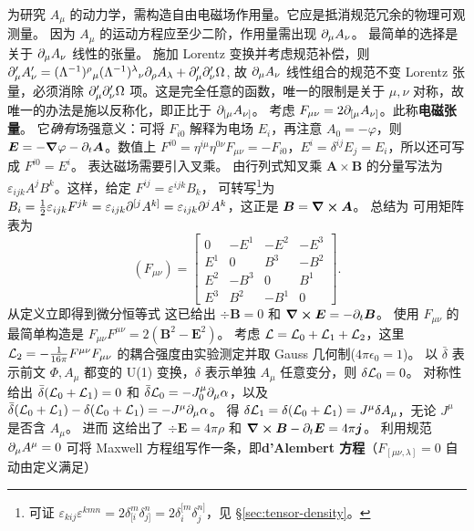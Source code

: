 为研究 $A_\mu$ 的动力学，需构造自由电磁场作用量。它应是抵消规范冗余的物理可观测量。
因为 $A_\mu$ 的运动方程应至少二阶，作用量需出现 $\partial_\mu A_\nu$。
最简单的选择是关于 $\partial_\mu A_\nu$ 线性的张量。
施加 Lorentz 变换并考虑规范补偿，则 $\partial'_\mu A'_\nu = (\Lambda^{-1})^{\rho}{}_{\mu} (\Lambda^{-1})^{\lambda}{}_{\nu} \partial_{\rho}A_{\lambda} + \partial'_{\mu}\partial'_{\nu}\Omega$,
故 $\partial_\mu A_\nu$ 线性组合的规范不变 Lorentz 张量，必须消除 $\partial'_{\mu}\partial'_{\nu}\Omega$ 项。这是完全任意的函数，唯一的限制是关于 $\mu,\nu$ 对称，故唯一的办法是施以反称化，即正比于 $\partial_{[\mu} A_{\nu]}$。
考虑 $F_{\mu\nu}=2\partial_{[\mu} A_{\nu]}$。此称\textbf{电磁张量}。
它\textit{确有}场强意义：可将 $F_{i0}$ 解释为电场 $E_i$，再注意 $A_0=-\varphi$，则 $\bm E=-\grad\varphi-\partial_t{\bm A}$。数值上 $F^{i0}=\eta^{i\mu}\eta^{0\nu}F_{\mu\nu}=-F_{i0}$，$E^i=\delta^{ij}E_j=E_i$，所以还可写成 $F^{i0}=E^i$。
表达磁场需要引入叉乘。
由行列式知叉乘 $\bm A\times \bm B$ 的分量写法为 $\varepsilon_{ijk} A^j B^k$。这样，给定 $F^{ij}=\varepsilon^{ijk}B_k$，
可转写\footnote{可证 $\varepsilon_{kij} \varepsilon^{kmn} =2\delta_{[i}^{m}\delta_{j]}^{n}=2\delta_{i}^{[m}\delta_{j}^{n]}$，见 \S\ref{sec:tensor-density}。}为 $B_i=\frac 12 \varepsilon_{ijk}F^{jk}=\varepsilon_{ijk}\partial^{[j}A^{k]}=\varepsilon_{ijk}\partial^j A^k$，这正是 $\bm B=\curl\bm A$。
总结为
可用矩阵表为
\[\left(F_{\mu\nu}\right)=\left[\begin{array}{cccc}0& -E^{1} & -E^{2} & -E^{3}\\E^{1} & 0 & B^{3} & -B^{2} \\E^{2} & -B^{3} & 0 & B^{1} \\E^{3} & B^{2} & -B^{1} & 0 \end{array}\right].\]
从定义立即得到微分恒等式
这已给出 $\div\bm B=0$ 和 $\curl\bm E=-\partial_t \bm B$。%
使用 $F_{\mu\nu}$ 的最简单构造是 $F_{\mu\nu} F^{\mu\nu}=2(\bm B^2-\bm E^2)$。
考虑 $\mathcal{L}= \mathcal{L}_0 + \mathcal{L}_1 + \mathcal{L}_2$，这里 $\mathcal{L}_2 = -\frac{1}{16\pi}F^{\mu\nu} F_{\mu\nu}$ 的耦合强度由实验测定并取 Gauss 几何制($4\pi\epsilon_0 = 1$)。
以 $\bar\delta$ 表示前文 $\Phi,A_\mu$ 都变的 U(1) 变换，$\delta$ 表示单独 $A_\mu$ 任意变分，则 $\delta\mathcal{L}_0=0$。
对称性给出 $\bar\delta(\mathcal{L}_0+\mathcal{L}_1) = 0$ 和 $\bar\delta\mathcal{L}_0 = -J_0^\mu\partial_\mu\alpha$，以及 $\bar\delta(\mathcal{L}_0+\mathcal{L}_1) - \delta(\mathcal{L}_0+\mathcal{L}_1) = -J^\mu\partial_\mu\alpha$。
得 $\delta\mathcal{L}_1=\delta(\mathcal{L}_0+\mathcal{L}_1)=J^\mu\delta A_\mu$，无论 $J^\mu$ 是否含 $A_\mu$。
进而
这给出了 $\div\bm E=4\pi \rho$ 和 $\curl\bm B-\partial_t \bm E=4\pi \bm j$。
利用规范 $\partial_\mu A^\mu=0$ 可将 Maxwell 方程组写作一条，即\textbf{d'Alembert 方程}（$F_{[\mu\nu,\lambda]}=0$ 自动由定义满足）

